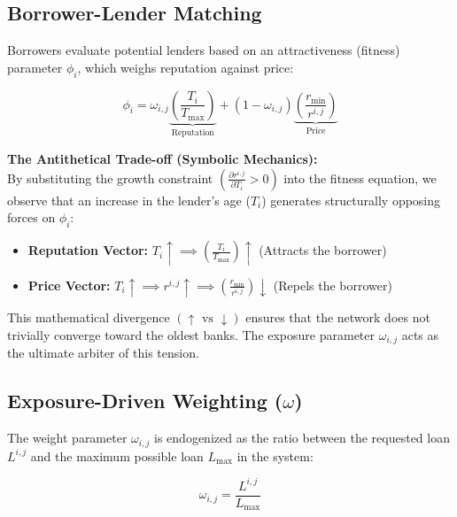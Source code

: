 \documentclass{article}
\begin{document}
\subsection{Borrower-Lender Matching}

\noindent Borrowers evaluate potential lenders based on an attractiveness (fitness) parameter $\phi_i$, which weighs reputation against price:

\begin{equation}
    \phi_i = \omega_{i,j} \underbrace{\left( \frac{T_i}{T_{\max}} \right)}_{\text{Reputation}} + (1 - \omega_{i,j}) \underbrace{\left( \frac{r_{\min}}{r^{i,j}} \right)}_{\text{Price}}
\end{equation}

\noindent \textbf{The Antithetical Trade-off (Symbolic Mechanics):} \\
By substituting the growth constraint $\left( \frac{\partial r^{i,j}}{\partial T_i} > 0 \right)$ into the fitness equation, we observe that an increase in the lender's age ($T_i$) generates structurally opposing forces on $\phi_i$:

\begin{itemize}
    \item \textbf{Reputation Vector:} $T_i \uparrow \implies \left( \frac{T_i}{T_{\max}} \right) \uparrow$ \quad (Attracts the borrower)
    \item \textbf{Price Vector:} \hspace{1.32cm} $T_i \uparrow \implies r^{i,j} \uparrow \implies \left( \frac{r_{\min}}{r^{i,j}} \right) \downarrow$ \quad (Repels the borrower)
\end{itemize}

\noindent This mathematical divergence $(\uparrow \text{ vs } \downarrow)$ ensures that the network does not trivially converge toward the oldest banks. The exposure parameter $\omega_{i,j}$ acts as the ultimate arbiter of this tension.

\subsection{Exposure-Driven Weighting ($\omega$)}

\noindent The weight parameter $\omega_{i,j}$ is endogenized as the ratio between the requested loan $L^{i,j}$ and the maximum possible loan $L_{\max}$ in the system:

\begin{equation}
    \omega_{i,j} = \frac{L^{i,j}}{L_{\max}}
\end{equation}
\end{document}
